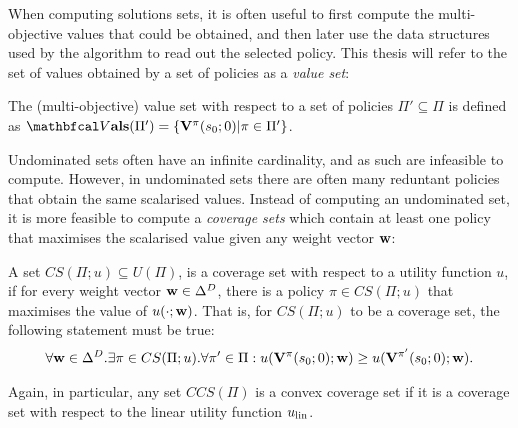     
    When computing solutions sets, it is often useful to first compute the multi-objective values that could be obtained, and then later use the data structures used by the algorithm to read out the selected policy. This thesis will refer to the set of values obtained by a set of policies as a \textit{value set}:
    \begin{defn}
        \label{def:2:mo_value_set}
        The \textnormal{(multi-objective) value set} with respect to a set of policies $\Pi'\subseteq\Pi$ is defined as $\valset(\Pi') = \{\bff{V}^{\pi}(s_0;0) | \pi \in \Pi'\}$.
    \end{defn}

    Undominated sets often have an infinite cardinality, and as such are infeasible to compute. However, in undominated sets there are often many reduntant policies that obtain the same scalarised values. Instead of computing an undominated set, it is more feasible to compute a \textit{coverage sets} which contain at least one policy that maximises the scalarised value given any weight vector $\mathbf{w}$:
    \begin{defn}
        \label{def:2:coverage_set}
        \label{def:2:convex_coverage_set}
        A set $CS(\Pi;u)\subseteq U(\Pi)$, is a \textnormal{coverage set} with respect to a utility function $u$, if for every weight vector $\mathbf{w}\in\Delta^D$, there is a policy $\pi\in CS(\Pi;u)$ that maximises the value of $u(\cdot;\mathbf{w})$. That is, for $CS(\Pi;u)$ to be a coverage set, the following statement must be true:
        \begin{align}
            \forall \mathbf{w}\in\Delta^D. \exists \pi\in CS(\Pi;u). \forall \pi'\in\Pi: u(\mathbf{V}^{\pi}(s_0;0);\mathbf{w}) \geq u(\mathbf{V}^{\pi'}(s_0;0);\mathbf{w}). \label{cond:coverage_set}
        \end{align}

        Again, in particular, any set $CCS(\Pi)$ is a \textnormal{convex coverage set} if it is a coverage set with respect to the linear utility function $u_{{\textnormal{lin}}}$. 
    \end{defn}

